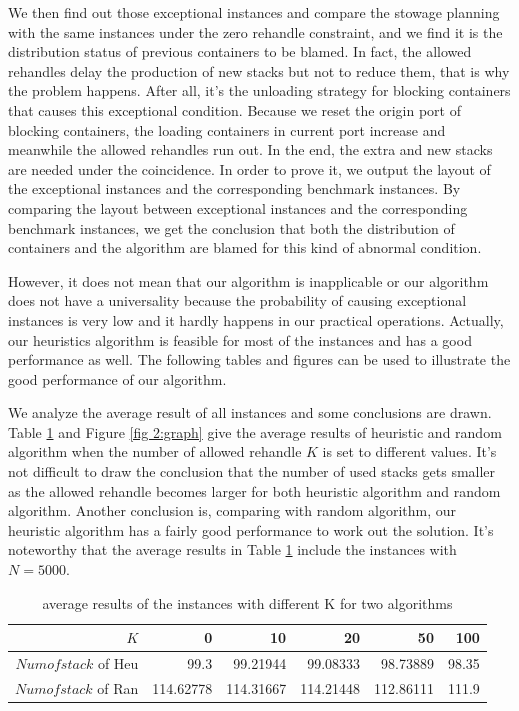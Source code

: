 \documentclass[review,3p,times,authoryear,12pt]{elsarticle}
\begin{document}
We then find out those exceptional instances and compare the stowage planning with the same instances under the zero rehandle constraint, and we find it is the distribution status of previous containers to be blamed.
In fact, the allowed rehandles delay the production of new stacks but not to reduce them, that is why the problem happens.
After all, it's the unloading strategy for blocking containers that causes this exceptional condition.
Because we reset the origin port of blocking containers, the loading containers in current port increase and meanwhile the allowed rehandles run out.
In the end, the extra and new stacks are needed under the coincidence.
In order to prove it, we output the layout of the exceptional instances and the corresponding benchmark instances.
By comparing the layout between exceptional instances and the corresponding benchmark instances, we get the conclusion that both the distribution of containers and the algorithm are blamed for this kind of abnormal condition.

However, it does not mean that our algorithm is inapplicable or our algorithm does not have a universality because the probability of causing exceptional instances is very low and it hardly happens in our practical operations.
Actually, our heuristics algorithm is feasible for most of the instances and has a good performance as well.
The following tables and figures can be used to illustrate the good performance of our algorithm.

We analyze the average result of all instances and some conclusions are drawn.
Table \ref{tab:4} and Figure \ref{fig 2:graph} give the average results of heuristic and random algorithm when the number of allowed rehandle $K$ is set to different values.
It's not difficult to draw the conclusion that the number of used stacks gets smaller as the allowed rehandle becomes larger for both heuristic algorithm and random algorithm.
Another conclusion is, comparing with random algorithm, our heuristic algorithm has a fairly good performance to work out the solution.
It's noteworthy that the average results in Table \ref{tab:4} include the instances with $N=5000$.

\begin{table}[htbp]
  \centering
  \setlength{\belowcaptionskip}{10pt}
  \caption{average results of the instances with different K for two algorithms}
    \begin{tabular}{r|r|r|r|r|r}
    \hline
     $K$       &0   &10  &20  &50  &100\\
    \hline
    $Numofstack$ of Heu   &99.3  &99.21944  &99.08333   &98.73889  &98.35\\
 \hline
    $Numofstack$ of Ran  &114.62778  &114.31667  &114.21448  &112.86111 &111.9\\
 \hline
    \end{tabular}
  \label{tab:4}
\end{table}
\end{document}
